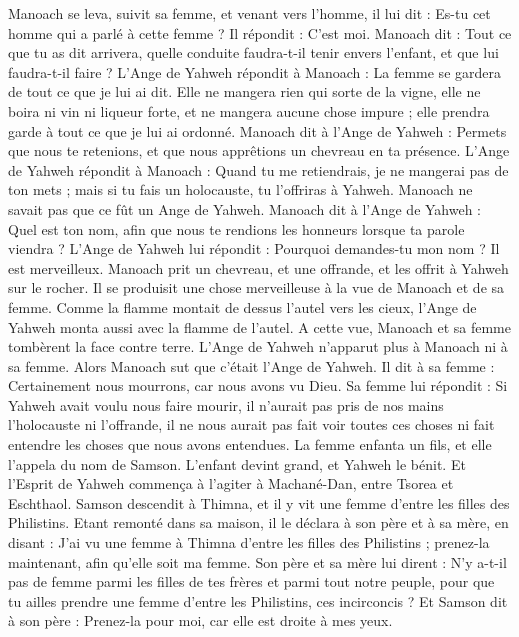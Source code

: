 \begin{multicols}{2}
Manoach se leva, suivit sa femme, et venant vers l'homme, il lui dit : Es-tu cet homme qui a parlé à cette femme ? Il répondit : C'est moi.
Manoach dit : Tout ce que tu as dit arrivera, quelle conduite faudra-t-il tenir envers l'enfant, et que lui faudra-t-il faire ?
L'Ange de Yahweh répondit à Manoach : La femme se gardera de tout ce que je lui ai dit.
Elle ne mangera rien qui sorte de la vigne, elle ne boira ni vin ni liqueur forte, et ne mangera aucune chose impure ; elle prendra garde à tout ce que je lui ai ordonné.
Manoach dit à l'Ange de Yahweh : Permets que nous te retenions, et que nous apprêtions un chevreau en ta présence.
L'Ange de Yahweh répondit à Manoach : Quand tu me retiendrais, je ne mangerai pas de ton mets ; mais si tu fais un holocauste, tu l'offriras à Yahweh. Manoach ne savait pas que ce fût un Ange de Yahweh.
Manoach dit à l'Ange de Yahweh : Quel est ton nom, afin que nous te rendions les honneurs lorsque ta parole viendra ?
L'Ange de Yahweh lui répondit : Pourquoi demandes-tu mon nom ? Il est merveilleux.
Manoach prit un chevreau, et une offrande, et les offrit à Yahweh sur le rocher. Il se produisit une chose merveilleuse à la vue de Manoach et de sa femme.
Comme la flamme montait de dessus l'autel vers les cieux, l'Ange de Yahweh monta aussi avec la flamme de l'autel. A cette vue, Manoach et sa femme tombèrent la face contre terre.
L'Ange de Yahweh n'apparut plus à Manoach ni à sa femme. Alors Manoach sut que c'était l'Ange de Yahweh.
Il dit à sa femme : Certainement nous mourrons, car nous avons vu Dieu.
Sa femme lui répondit : Si Yahweh avait voulu nous faire mourir, il n'aurait pas pris de nos mains l'holocauste ni l'offrande, il ne nous aurait pas fait voir toutes ces choses ni fait entendre les choses que nous avons entendues.
La femme enfanta un fils, et elle l'appela du nom de Samson. L'enfant devint grand, et Yahweh le bénit.
Et l'Esprit de Yahweh commença à l'agiter à Machané-Dan, entre Tsorea et Eschthaol.
\VerseOne{}Samson descendit à Thimna, et il y vit une femme d'entre les filles des Philistins.
Etant remonté dans sa maison, il le déclara à son père et à sa mère, en disant : J'ai vu une femme à Thimna d'entre les filles des Philistins ; prenez-la maintenant, afin qu'elle soit ma femme.
Son père et sa mère lui dirent : N'y a-t-il pas de femme parmi les filles de tes frères et parmi tout notre peuple, pour que tu ailles prendre une femme d'entre les Philistins, ces incirconcis ? Et Samson dit à son père : Prenez-la pour moi, car elle est droite à mes yeux.

\end{multicols}
